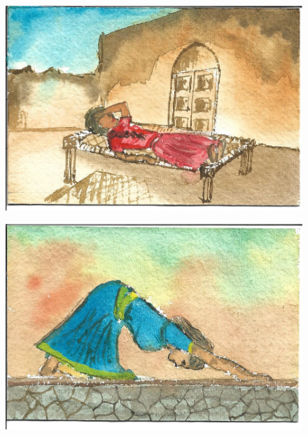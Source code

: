 \documentclass[12pt]{article}
\begin{document}
\begin{figure}[h!]
\centering
\includegraphics[width=.7\paperwidth]{pictures/AR}
\end{figure}

\newpage

\begin{figure}[h!]
\centering
\includegraphics[width=.7\paperwidth]{pictures/LE}
\end{figure}

\newpage
\end{document}
